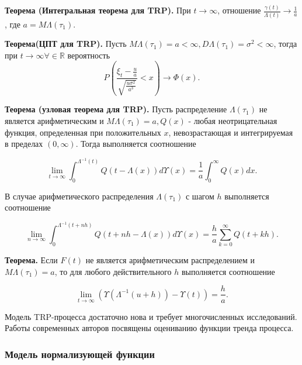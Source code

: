 {\bfseries Теорема (Интегральная теорема для TRP).} При ${t \to \infty}$, отношение ${\frac{\gamma(t)}{\Lambda(t)} \to \frac{1}{a}}$, где $a = M\Lambda(\tau_1)$. 

{\bfseries Теорема(ЦПТ для TRP).} Пусть $M\Lambda(\tau_1) =  a < \infty, D\Lambda(\tau_1) = \sigma^2 < \infty$, тогда при $ {t \to \infty} \forall \in \mathbb{R} $ вероятность
\begin{equation}
P(\frac{\xi_t - \frac{u}{a}}{\sqrt{\frac{u\sigma^2}{a^3}}} < x) \to \Phi(x).
\end{equation}

{\bfseries Теорема (узловая теорема для TRP).} Пусть распределение $\Lambda(\tau_1)$ не является арифметическим и $M\Lambda(\tau_1) = a, Q(x)$ - любая неотрицательная функция, определенная при положительных $x$, невозрастающая и интегрируемая в пределах $(0, \infty)$. Тогда выполняется соотношение

\begin{equation}
\lim_{t \to \infty} \int_0^{\Lambda^{-1}(t)} Q(t - \Lambda(x)) d\Upsilon(x) = \frac{1}{a} \int_0^\infty Q(x) d x.
\end{equation}

В случае арифметического распределения $\Lambda(\tau_1)$  с шагом $h$ выполняется соотношение

\begin{equation}
\lim_{n \to \infty} \int_0^{\Lambda^{-1}(t + nh)} Q(t + nh - \Lambda(x)) d\Upsilon(x) = \frac{h}{a} \sum_{k = 0}^\infty Q(t + kh) .
\end{equation}

{\bfseries Теорема.} Если $F(t)$ не является арифметическим распределением и $M\Lambda(\tau_1) = a$, то для любого действительного $h$ выполняется соотношение

 \begin{equation}
\lim_{t \to \infty} (\Upsilon(\Lambda^{-1}(u + h)) - \Upsilon(t)) = \frac{h}{a}.
\end{equation}

Модель TRP-процесса достаточно нова и требует многочисленных исследований. Работы современных авторов посвящены оцениванию функции тренда процесса.

\begin{center}
\item\subsubsection{Модель нормализующей функции}\hspace{4pt}
\end{center}


